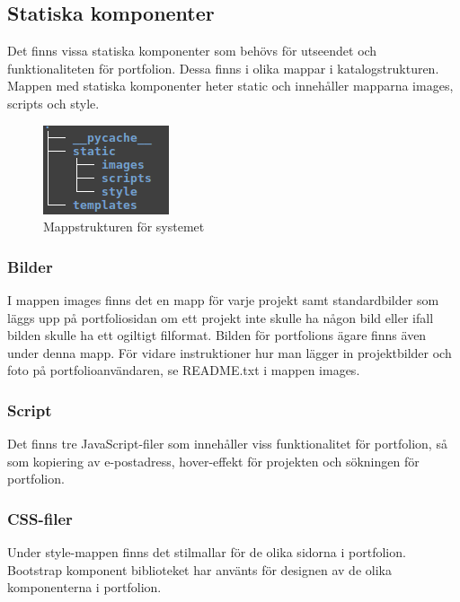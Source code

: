 \documentclass{TDP003mall}
\begin{document}
\subsection{Statiska komponenter}

Det finns vissa statiska komponenter som behövs för utseendet och funktionaliteten för portfolion. Dessa finns i olika mappar i katalogstrukturen. Mappen med statiska komponenter heter static och innehåller mapparna images, scripts och style.


\begin{figure}[h]
  \centering
  \includegraphics[scale=0.8]{folder_structure}
  \caption{Mappstrukturen för systemet}

\end{figure}


\subsubsection{Bilder}

I mappen images finns det en mapp för varje projekt samt standardbilder som läggs upp på portfoliosidan om ett projekt inte skulle ha någon bild eller ifall bilden skulle ha ett ogiltigt filformat. Bilden för portfolions ägare finns även under denna mapp. För vidare instruktioner hur man lägger in projektbilder och foto på portfolioanvändaren, se README.txt i mappen images.

\subsubsection{Script}

Det finns tre JavaScript-filer som innehåller viss funktionalitet för portfolion, så som kopiering av e-postadress, hover-effekt för projekten och sökningen för portfolion.

\subsubsection{CSS-filer}

Under style-mappen finns det stilmallar för de olika sidorna i portfolion. Bootstrap komponent biblioteket har använts för designen av de olika komponenterna i portfolion.
\end{document}
